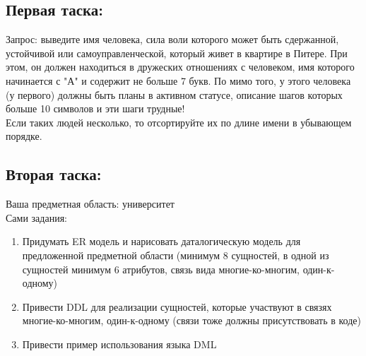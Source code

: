\documentclass[12pt,onecolumn]{article}
\begin{document}
\subsection{Первая таска:}
Запрос: выведите имя человека, сила воли которого может быть сдержанной, устойчивой или самоуправленческой, который живет в квартире в Питере. При этом, он должен находиться в дружеских отношениях с человеком, имя которого начинается с "А" и содержит не больше 7 букв. По мимо того, у этого человека (у первого) должны быть планы в активном статусе, описание шагов которых больше 10 символов и эти шаги трудные!\\
Если таких людей несколько, то отсортируйте их по длине имени в убывающем порядке.\\
\subsection{Вторая таска:}
Ваша предметная область: университет  \\
Сами задания: \\
\begin{enumerate}
  \item Придумать ER модель и нарисовать даталогическую модель для предложенной предметной области (минимум 8 сущностей, в одной из сущностей минимум 6 атрибутов, связь вида многие-ко-многим, один-к-одному)
  \item Привести DDL для реализации сущностей, которые участвуют в связях многие-ко-многим, один-к-одному (связи тоже должны присутствовать в коде)
  \item Привести пример использования языка DML
\end{enumerate}
\end{document}
